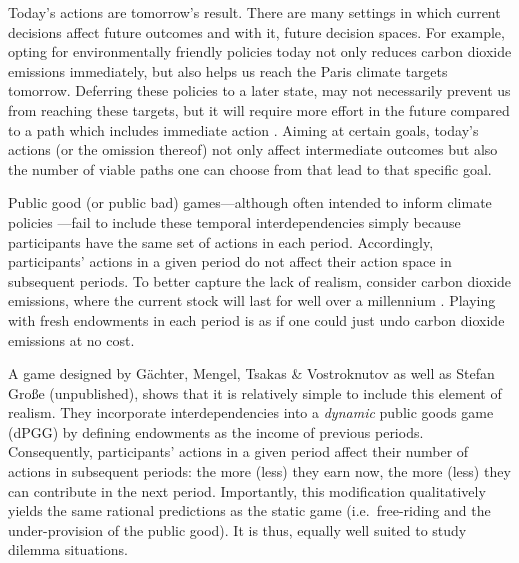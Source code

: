 \documentclass[
  authoryear,
  review,
  3p,
  onecolumn]{elsarticle}
\begin{document}
Today's actions are tomorrow's result. There are many settings in which
current decisions affect future outcomes and with it, future decision
spaces. For example, opting for environmentally friendly policies today
not only reduces carbon dioxide emissions immediately, but also helps us
reach the Paris climate targets tomorrow. Deferring these policies to a
later state, may not necessarily prevent us from reaching these targets,
but it will require more effort in the future compared to a path which
includes immediate action \citep{HaenselEtAl2022}. Aiming at certain
goals, today's actions (or the omission thereof) not only affect
intermediate outcomes but also the number of viable paths one can choose
from that lead to that specific goal.

Public good (or public bad) games---although often intended to inform
climate policies
\citep[e.g.][]{MilinskiEtAl2006, TavoniEtAl2011, Hauser2014, BrickEtAl2015, GomezEtAl2018, CalzolariEtAl2018, CookEtAl2019}---fail
to include these temporal interdependencies simply because participants
have the same set of actions in each period. Accordingly, participants'
actions in a given period do not affect their action space in subsequent
periods. To better capture the lack of realism, consider carbon dioxide
emissions, where the current stock will last for well over a millennium
\citep{Inman2008, CalzolariEtAl2018}. Playing with fresh endowments in
each period is as if one could just undo carbon dioxide emissions at no
cost.

A game designed by Gächter, Mengel, Tsakas \& Vostroknutov \citeyearpar[
hereafter, GMTV]{GMTV2017} as well as Stefan Große (unpublished), shows
that it is relatively simple to include this element of realism. They
incorporate interdependencies into a \emph{dynamic} public goods game
(dPGG) by defining endowments as the income of previous periods.
Consequently, participants' actions in a given period affect their
number of actions in subsequent periods: the more (less) they earn now,
the more (less) they can contribute in the next period. Importantly,
this modification qualitatively yields the same rational predictions as
the static game (i.e.~free-riding and the under-provision of the public
good). It is thus, equally well suited to study dilemma situations.
\end{document}
